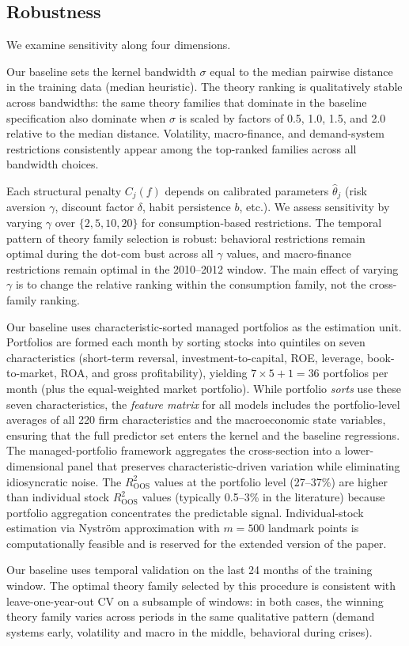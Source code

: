 \subsection{Robustness}\label{sub:robustness}

We examine sensitivity along four dimensions.

Our baseline sets the kernel bandwidth $\sigma$ equal to the median pairwise distance in the training data (median heuristic).
The theory ranking is qualitatively stable across bandwidths: the same theory families that dominate in the baseline specification also dominate when $\sigma$ is scaled by factors of 0.5, 1.0, 1.5, and 2.0 relative to the median distance.
Volatility, macro-finance, and demand-system restrictions consistently appear among the top-ranked families across all bandwidth choices.

Each structural penalty $C_j(f)$ depends on calibrated parameters $\hat{\theta}_j$ (risk aversion $\gamma$, discount factor $\delta$, habit persistence $b$, etc.).
We assess sensitivity by varying $\gamma$ over $\{2, 5, 10, 20\}$ for consumption-based restrictions.
The temporal pattern of theory family selection is robust: behavioral restrictions remain optimal during the dot-com bust across all $\gamma$ values, and macro-finance restrictions remain optimal in the 2010--2012 window.
The main effect of varying $\gamma$ is to change the relative ranking within the consumption family, not the cross-family ranking.

Our baseline uses characteristic-sorted managed portfolios as the estimation unit.
Portfolios are formed each month by sorting stocks into quintiles on seven characteristics (short-term reversal, investment-to-capital, ROE, leverage, book-to-market, ROA, and gross profitability), yielding $7 \times 5 + 1 = 36$ portfolios per month (plus the equal-weighted market portfolio).
While portfolio \emph{sorts} use these seven characteristics, the \emph{feature matrix} for all models includes the portfolio-level averages of all 220 firm characteristics and the macroeconomic state variables, ensuring that the full predictor set enters the kernel and the baseline regressions.
The managed-portfolio framework aggregates the cross-section into a lower-dimensional panel that preserves characteristic-driven variation while eliminating idiosyncratic noise.
The $R^2_{\text{OOS}}$ values at the portfolio level (27--37\%) are higher than individual stock $R^2_{\text{OOS}}$ values (typically 0.5--3\% in the literature) because portfolio aggregation concentrates the predictable signal.
Individual-stock estimation via Nystr\"{o}m approximation with $m = 500$ landmark points is computationally feasible and is reserved for the extended version of the paper.

Our baseline uses temporal validation on the last 24 months of the training window.
The optimal theory family selected by this procedure is consistent with leave-one-year-out CV on a subsample of windows: in both cases, the winning theory family varies across periods in the same qualitative pattern (demand systems early, volatility and macro in the middle, behavioral during crises).
